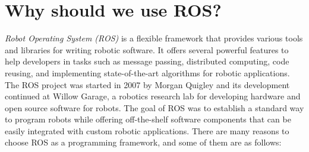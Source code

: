 \documentclass[../../main]{subfiles}
\begin{document}
\section{Why should we use ROS?}\cite{joseph2018mastering}
\emph{Robot Operating System (ROS)} is a flexible framework that provides various tools and
libraries for writing robotic software. It offers several powerful features to help developers
in tasks such as message passing, distributed computing, code reusing, and implementing
state-of-the-art algorithms for robotic applications. The ROS project was started in 2007
by Morgan Quigley and its development continued at Willow Garage, a robotics research
lab for developing hardware and open source software for robots. The goal of ROS was
to establish a standard way to program robots while offering off-the-shelf software
components that can be easily integrated with custom robotic applications. There are
many reasons to choose ROS as a programming framework, and some of them are as
follows:
\end{document}
